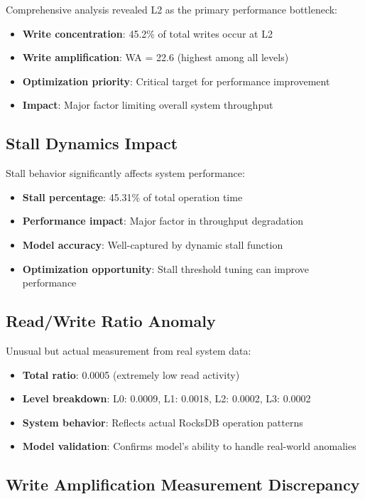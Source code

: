 \documentclass[11pt]{article}
\begin{document}
Comprehensive analysis revealed L2 as the primary performance bottleneck:
\begin{itemize}
    \item \textbf{Write concentration}: 45.2\% of total writes occur at L2
    \item \textbf{Write amplification}: WA = 22.6 (highest among all levels)
    \item \textbf{Optimization priority}: Critical target for performance improvement
    \item \textbf{Impact}: Major factor limiting overall system throughput
\end{itemize}

\subsection{Stall Dynamics Impact}

Stall behavior significantly affects system performance:
\begin{itemize}
    \item \textbf{Stall percentage}: 45.31\% of total operation time
    \item \textbf{Performance impact}: Major factor in throughput degradation
    \item \textbf{Model accuracy}: Well-captured by dynamic stall function
    \item \textbf{Optimization opportunity}: Stall threshold tuning can improve performance
\end{itemize}

\subsection{Read/Write Ratio Anomaly}

Unusual but actual measurement from real system data:
\begin{itemize}
    \item \textbf{Total ratio}: 0.0005 (extremely low read activity)
    \item \textbf{Level breakdown}: L0: 0.0009, L1: 0.0018, L2: 0.0002, L3: 0.0002
    \item \textbf{System behavior}: Reflects actual RocksDB operation patterns
    \item \textbf{Model validation}: Confirms model's ability to handle real-world anomalies
\end{itemize}

\subsection{Write Amplification Measurement Discrepancy}
\end{document}
